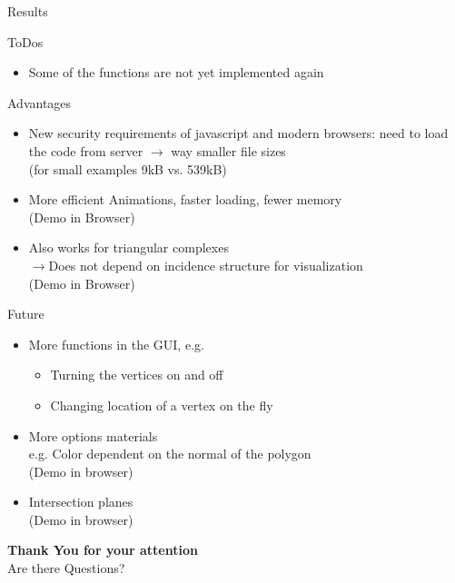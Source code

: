 \documentclass{beamer}
\numberwithin{equation}{aufgabe}
\begin{document}
\begin{frame}{Results}
    \begin{block}{ToDos}
        \begin{itemize}[label=-]
            \item Some of the functions are not yet implemented again
        \end{itemize}
    \end{block}
\pause
    \begin{exampleblock}{Advantages}
        \begin{itemize}[label=-]
            \item New security requirements of javascript and modern browsers: need to load the code from server $\xrightarrow{}$ way smaller file sizes\\
                (for small examples 9kB vs. 539kB)
                \pause
            \item More efficient Animations, faster loading, fewer memory\\
                (Demo in Browser)
                \pause
            \item Also works for triangular complexes\\
            $\xrightarrow{}$Does not depend on incidence structure for visualization\\
            (Demo in Browser)
        \end{itemize}
    \end{exampleblock}
\end{frame}
\begin{frame}
    \begin{block}{Future}
        \begin{itemize}[label=-]
            \item More functions in the GUI, e.g. \\
            \begin{itemize}[label=-]
                \item Turning the vertices on and off
                \item Changing location of a vertex on the fly
            \end{itemize}
            \item More options materials\\
                e.g. Color dependent on the normal of the polygon\\
                (Demo in browser)
            \item Intersection planes \\
                (Demo in browser)    
        \end{itemize}
    \end{block}
\end{frame}

\begin{frame}
    \textbf{\Large Thank You for your attention}\\
    \bigskip
    Are there Questions?
    \bigskip
    \nocite{*}
    
    \printbibliography
\end{frame}
\end{document}
